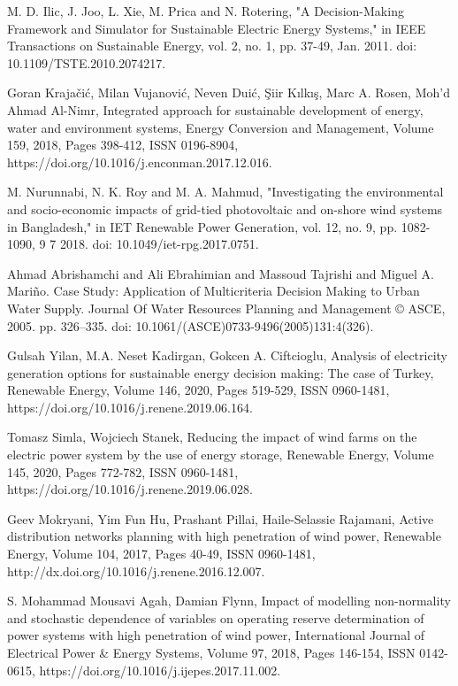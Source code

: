 \begin{thebibliography}{99}
\begin{singlespace}
 M. D. Ilic, J. Joo, L. Xie, M. Prica and N. Rotering, "A Decision-Making Framework and Simulator for Sustainable Electric Energy Systems," in IEEE Transactions on Sustainable Energy, vol. 2, no. 1, pp. 37-49, Jan. 2011. doi: 10.1109/TSTE.2010.2074217.

 Goran Krajačić, Milan Vujanović, Neven Duić, Şiir Kılkış, Marc A. Rosen, Moh'd Ahmad Al-Nimr, Integrated approach for sustainable development of energy, water and environment systems,
Energy Conversion and Management, Volume 159, 2018, Pages 398-412, ISSN 0196-8904, https://doi.org/10.1016/j.enconman.2017.12.016.

 M. Nurunnabi, N. K. Roy and M. A. Mahmud, "Investigating the environmental and socio-economic impacts of grid-tied photovoltaic and on-shore wind systems in Bangladesh," in IET Renewable Power Generation, vol. 12, no. 9, pp. 1082-1090, 9 7 2018. doi: 10.1049/iet-rpg.2017.0751.

 Ahmad Abrishamchi  and Ali Ebrahimian  and Massoud Tajrishi  and Miguel A. Mariño. Case Study: Application of Multicriteria Decision Making to Urban Water Supply. Journal Of Water Resources Planning and Management © ASCE, 2005. pp. 326–335. doi: 10.1061/(ASCE)0733-9496(2005)131:4(326).

 Gulsah Yilan, M.A. Neset Kadirgan, Gokcen A. Ciftcioglu, Analysis of electricity generation options for sustainable energy decision making: The case of Turkey, Renewable Energy, Volume 146, 2020, Pages 519-529, ISSN 0960-1481, https://doi.org/10.1016/j.renene.2019.06.164. 

 Tomasz Simla, Wojciech Stanek, Reducing the impact of wind farms on the electric power system by the use of energy storage, Renewable Energy, Volume 145, 2020, Pages 772-782, ISSN 0960-1481, \\ https://doi.org/10.1016/j.renene.2019.06.028.

 Geev Mokryani, Yim Fun Hu, Prashant Pillai, Haile-Selassie Rajamani, Active distribution networks planning with high penetration of wind power, Renewable Energy, Volume 104, 2017, Pages 40-49, ISSN 0960-1481, http://dx.doi.org/10.1016/j.renene.2016.12.007.

 S. Mohammad Mousavi Agah, Damian Flynn, Impact of modelling non-normality and stochastic dependence of variables on operating reserve determination of power systems with high penetration of wind power, International Journal of Electrical Power \& Energy Systems, Volume 97, 2018, Pages 146-154, ISSN 0142-0615, https://doi.org/10.1016/j.ijepes.2017.11.002.


\end{singlespace}
\end{thebibliography}
